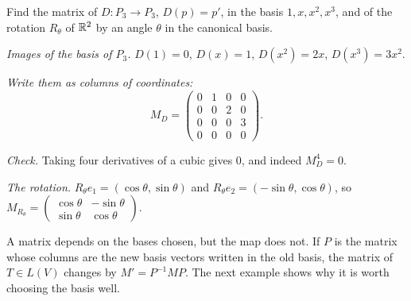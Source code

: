 \begin{example}\label{ex:matrices}
  Find the matrix of $D:P_3\to P_3$, $D(p)=p'$, in the basis $1,x,x^2,x^3$, and of the rotation $R_\theta$ of $\mathbb{R}^2$ by an angle $\theta$ in the canonical basis.
\end{example}
\begin{solution}
  \begin{steps}
    \item \emph{Images of the basis of $P_3$.} $D(1)=0$, $D(x)=1$, $D(x^2)=2x$, $D(x^3)=3x^2$.
    \item \emph{Write them as columns of coordinates:}
      \[
        M_D=\begin{pmatrix}0&1&0&0\\0&0&2&0\\0&0&0&3\\0&0&0&0\end{pmatrix}.
      \]
    \item \emph{Check.} Taking four derivatives of a cubic gives $0$, and indeed $M_D^4=0$.
    \item \emph{The rotation.} $R_\theta e_1=(\cos\theta,\sin\theta)$ and $R_\theta e_2=(-\sin\theta,\cos\theta)$, so $M_{R_\theta}=\begin{pmatrix}\cos\theta&-\sin\theta\\ \sin\theta&\cos\theta\end{pmatrix}$.
  \end{steps}
\end{solution}

A matrix depends on the bases chosen, but the map does not. If $P$ is the matrix whose columns are the new basis vectors written in the old basis, the matrix of $T\in L(V)$ changes by $M'=P^{-1}MP$. The next example shows why it is worth choosing the basis well.


